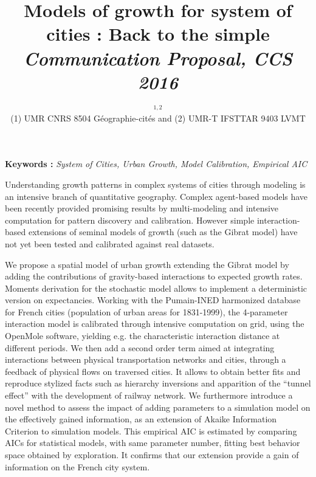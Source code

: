 


\title{Models of growth for system of cities : Back to the simple\\\bigskip
\textit{Communication Proposal, CCS 2016}
}
\author{\small{}$^{1,2}$\\
\small(1) UMR CNRS 8504 Géographie-cités and (2) UMR-T IFSTTAR 9403 LVMT
}
\date{}

\maketitle

\justify


\textbf{Keywords : }\textit{System of Cities, Urban Growth, Model Calibration, Empirical AIC}

\bigskip

Understanding growth patterns in complex systems of cities through modeling is an intensive branch of quantitative geography. Complex agent-based models have been recently provided promising results by multi-modeling and intensive computation for pattern discovery and calibration. However simple interaction-based extensions of seminal models of growth (such as the Gibrat model) have not yet been tested and calibrated against real datasets.

We propose a spatial model of urban growth extending the Gibrat model by adding the contributions of gravity-based interactions to expected growth rates. Moments derivation for the stochastic model allows to implement a deterministic version on expectancies. Working with the Pumain-INED harmonized database for French cities (population of urban areas for 1831-1999), the 4-parameter interaction model is calibrated through intensive computation on grid, using the OpenMole software, yielding e.g. the characteristic interaction distance at different periods. We then add a second order term aimed at integrating interactions between physical transportation networks and cities, through a feedback of physical flows on traversed cities.%
 It allows to obtain better fits and reproduce stylized facts such as hierarchy inversions and apparition of the ``tunnel effect'' with the development of railway network. We furthermore introduce a novel method to assess the impact of adding parameters to a simulation model on the effectively gained information, as an extension of Akaike Information Criterion to simulation models. This empirical AIC is estimated by comparing AICs for statistical models, with same parameter number, fitting best behavior space obtained by exploration. It confirms that our extension provide a gain of information on the French city system.

